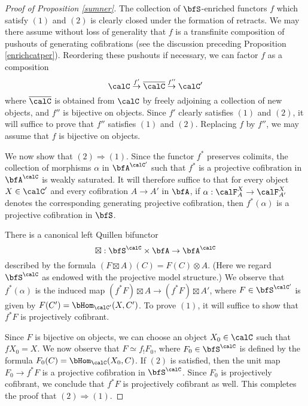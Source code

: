 \begin{proof}[Proof of Proposition \ref{sumner}]
The collection of $\bfS$-enriched functors $f$ which satisfy $(1)$ and $(2)$ is clearly
closed under the formation of retracts. We may there assume without loss of generality
that $f$ is a transfinite composition of pushouts of generating cofibrations
(see the discussion preceding Proposition \ref{enrichcatper}). Reordering
these pushouts if necessary, we can factor $f$ as a composition
$$ \calC \stackrel{f'}{\rightarrow} \overline{\calC} \stackrel{f''}{\rightarrow} \calC'$$
where $\overline{\calC}$ is obtained from $\calC$ by freely adjoining a collection of
new objects, and $f''$ is bijective on objects. Since $f'$ clearly satisfies
$(1)$ and $(2)$, it will suffice to prove that $f''$ satisfies $(1)$ and $(2)$.
Replacing $f$ by $f''$, we may assume that $f$ is bijective on objects.

We now show that $(2) \Rightarrow (1)$. Since the functor $f^{\ast}$ preserves colimits, the collection of morphisms $\alpha$ in $\bfA^{\calC'}$ such that $f^{\ast}$ is a projective cofibration in $\bfA^{\calC}$ is weakly saturated. It will therefore suffice to that for every object $X \in \calC'$ and every cofibration $A \rightarrow A'$ in $\bfA$, if $\alpha: \calF^{X}_{A} \rightarrow \calF^{X}_{A'}$ denotes the corresponding generating projective cofibration, then $f^{\ast}(\alpha)$ is a projective cofibration in $\bfS$.

There is a canonical left Quillen bifunctor
$$ \boxtimes: \bfS^{\calC} \times \bfA \rightarrow \bfA^{\calC}$$
described by the formula $(F \boxtimes A)(C) = F(C) \otimes A$.
(Here we regard $\bfS^{\calC}$ as endowed with the projective model structure.)
We observe that $f^{\ast}(\alpha)$ is the induced map
$(f^{\ast} F) \boxtimes A \rightarrow (f^{\ast} F) \boxtimes A'$, where
$F \in \bfS^{\calC'}$ is given by $F(C') = \bHom_{\calC'}( X, C')$. 
To prove $(1)$, it will suffice to show that $f^{\ast} F$ is projectively cofibrant.

Since $F$ is bijective on objects, we can choose an object $X_0 \in \calC$ such that
$fX_0 = X$. We now observe that $F \simeq f_{!} F_0$, where $F_0 \in \bfS^{\calC}$
is defined by the formula $F_0(C) = \bHom_{\calC}(X_0, C)$. If $(2)$ is satisfied, then
the unit map $F_0 \rightarrow f^{\ast} F$ is a projective cofibration in $\bfS^{\calC}$.
Since $F_0$ is projectively cofibrant, we conclude that $f^{\ast} F$ is projectively cofibrant as well.
This completes the proof that $(2) \Rightarrow (1)$.


\end{proof}

